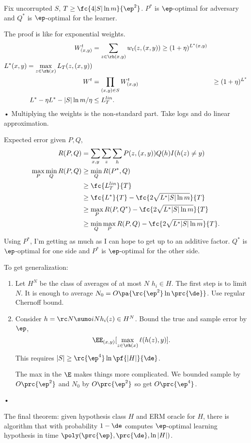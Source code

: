 \begin{thm}
Fix uncorrupted $S$, $T\ge \fc{4|S|\ln m}{\ep^2}$. $P^*$ is $\ep$-optimal for adversary and $Q^*$ is $\ep$-optimal for the learner.
\end{thm}
The proof is like for exponential weights. 
\begin{align}
W_{(x,y)}^t &=\sum_{z\in \rh(x,y)} w_t(z,(x,y)) \ge (1+\eta)^{L^*(x,y)}\\
L^*(x,y) = \max_{z\in \rh(x)}L_T(z,(x,y))\\
W^t &=\prod_{(x,y)\in S} W_{(x,y)}^t & \ge(1+\eta)^{L^*}\\
L^*-\eta L^* - |S|\ln m/\eta &\le L_T^{lin}.
\end{align}•
Multiplying the weights is the non-standard part. Take logs and do linear approximation.

Expected error given $P,Q$,
\begin{align}
R(P,Q) & =\sum_{x,y}\sum_z\sum_h P(z,(x,y)) Q(h) I(h(z)\ne y)\\
\max_P\min_Q R(P,Q)&\ge \min_Q R(P^*,Q)\\
&\ge \fc{L_T^{lin}}{T}\\
&\ge \fc{L^*}{T} - \fc{2\sqrt{L^*|S|\ln m}}{T}\\
&\ge \max_P R(P,Q^*) - \fc{2\sqrt{L^*|S|\ln m}}{T}\\
& \ge \min_Q\max_P R(P,Q) - \fc{2\sqrt{L^*|S|\ln m}}{T}.
\end{align}
Using $P^*$, I'm getting as much as I can hope to get up to an additive factor. %
$Q^*$ is $\ep$-optimal for one side and $P^*$ is $\ep$-optimal for the other side.

To get generalization: 
\begin{enumerate}
\item
Let $H^N$ be the class of averages of at most $N$ $h_i\in H$. The first step is to limit $N$. It is enough to average $N_0=O\pa{\rc{\ep^2}\ln \prc{\de}}$. Use regular Chernoff bound.
\item
Consider $h=\rc N\sumo iN h_i(z) \in H^N$. Bound the true and sample error by $\ep$, 
$$
\EE_{(x,y)}[\max_{z\in \rh(x)} \ell(h(z),y)].
$$
This requires $|S|\ge \rc{\ep^4} \ln \pf{|H|}{\de}$. 

The max in the $\E$ makes things more complicated. We bounded sample by $O\prc{\ep^2}$ and $N_0$ by $O\prc{\ep^2}$ so get $O\prc{\ep^4}$. 
\end{enumerate}•

The final theorem: given hypothesis class $H$ and ERM oracle for $H$, there is algorithm that with probability $1-\de$ computes $\ep$-optimal learning hypothesis in time $\poly(\prc{\ep},\prc{\de},\ln |H|)$.


